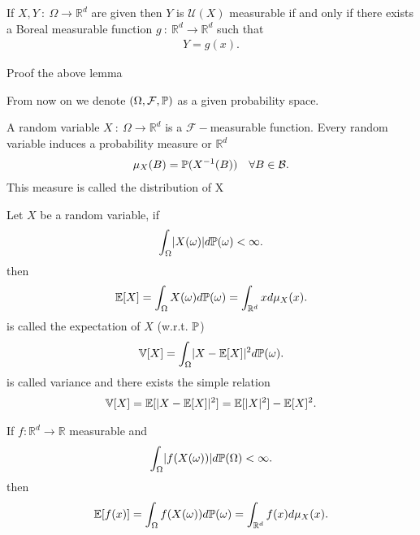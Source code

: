 \begin{lemma}
 If $X,Y \ : \ \Omega  \to \mathbb{R}^{d} $  are given then $Y$ is $\mathcal{U}(X)$ measurable if and only if 
 there exists a Boreal measurable function $g \ : \ \mathbb{R}^{d} \to  \mathbb{R}^{d}  $ such that 
 \begin{align*}
  Y = g(x)
 .\end{align*}
\end{lemma}
\begin{exercise}
  Proof the above lemma
\end{exercise}
From now on we denote $(\Omega ,\mathcal{F},\P)$ as a given probability space.
\begin{definition}
 A random variable $X \ : \ \Omega  \to \mathbb{R}^{d} $  is a $\mathcal{F}-$measurable function.
 Every random variable induces a probability measure or $\mathbb{R}^{d} $ 
 \begin{align*}
  \mu_X(B) = \P(X^{-1}(B) ) \quad \forall B \in  \mathcal{B}
 .\end{align*}
This measure is called the distribution of X
\end{definition}
\begin{definition}
 Let $X$ be a random variable, if 
 \begin{align*}
   \int_{\Omega } \abs{X(\omega )}d\P(\omega ) < \infty
 .\end{align*}
 then 
 \begin{align*}
   \E[X] = \int_{\Omega } X(\omega ) d\P(\omega ) =  \int_{\mathbb{R}^{d} }x d\mu_X(x)
 .\end{align*}
 is called the expectation of $X$ (w.r.t. $\P$) \\[1ex]
 \begin{align*}
   \V[X] = \int_{\Omega } \abs{X - \E[X]}^2 d\P(\omega )
 .\end{align*}
 is called variance and there exists the simple relation 
 \begin{align*}
   \V[X] = \E[\abs{X-\E[X]}^2] = \E[\abs{X}^2] - \E[X]^2
 .\end{align*}
\end{definition}
\begin{remark}
 If $f : \mathbb{R}^{d} \to  \mathbb{R} $ measurable and 
 \begin{align*}
   \int_{\Omega } \abs{f(X(\omega ))} d\P(\Omega ) <\infty
 .\end{align*}
 then 
 \begin{align*}
   \E[f(x)] = \int_{\Omega }f(X(\omega ))d\P(\omega ) = \int_{\mathbb{R}^{d} }f(x) d\mu_X(x)
 .\end{align*}
\end{remark}
